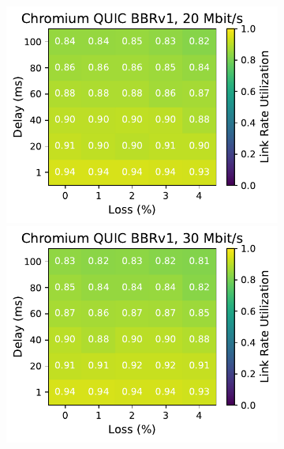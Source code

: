 \begin{figure}[ht]
\begin{subfigure}[b]{0.22\linewidth}
        \includegraphics[width=\linewidth,trim={0 0 2cm 0},clip]{splitting/figures/heatmaps/heatmap_quic_bbr1_20mbps.pdf}
        \includegraphics[width=\linewidth,trim={0 0 2cm 0},clip]{splitting/figures/heatmaps/heatmap_quic_bbr1_30mbps.pdf}

\end{subfigure}
\end{figure}
